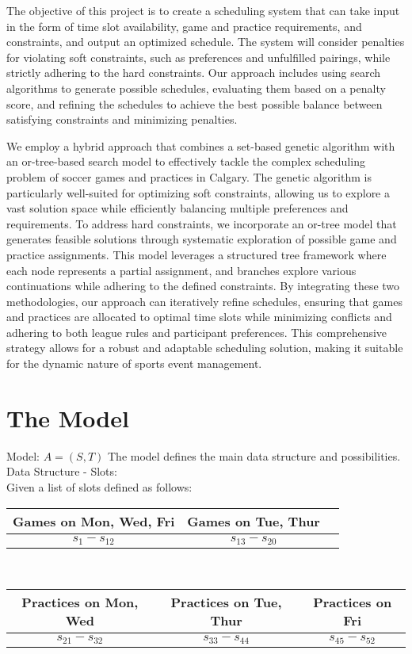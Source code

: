 \documentclass[12 pt]{article}        	%
\begin{document}
The objective of this project is to create a scheduling system that can take input in the form of time slot availability, game and practice requirements, and constraints, and output an optimized schedule. The system will consider penalties for violating soft constraints, such as preferences and unfulfilled pairings, while strictly adhering to the hard constraints. Our approach includes using search algorithms to generate possible schedules, evaluating them based on a penalty score, and refining the schedules to achieve the best possible balance between satisfying constraints and minimizing penalties.

We employ a hybrid approach that combines a set-based genetic algorithm with an or-tree-based search model to effectively tackle the complex scheduling problem of soccer games and practices in Calgary. The genetic algorithm is particularly well-suited for optimizing soft constraints, allowing us to explore a vast solution space while efficiently balancing multiple preferences and requirements. To address hard constraints, we incorporate an or-tree model that generates feasible solutions through systematic exploration of possible game and practice assignments. This model leverages a structured tree framework where each node represents a partial assignment, and branches explore various continuations while adhering to the defined constraints. By integrating these two methodologies, our approach can iteratively refine schedules, ensuring that games and practices are allocated to optimal time slots while minimizing conflicts and adhering to both league rules and participant preferences. This comprehensive strategy allows for a robust and adaptable scheduling solution, making it suitable for the dynamic nature of sports event management.

\section{The Model}
Model: $A = (S, T)$
The model defines the main data structure and possibilities.
Data Structure - Slots: 
\\
Given a list of slots defined as follows:
\\\begin{tabular}{|c|c|c|}
    \hline
     Games on Mon, Wed, Fri & Games on Tue, Thur   \\ \hline
     $s_1 - s_{12}$ & $s_{13} - s_{20}$  \\
     \hline
\end{tabular}
\\\begin{tabular}{|c|c|c|}
    \hline
     Practices on Mon, Wed & Practices on Tue, Thur & Practices on Fri  \\ \hline
     $s_{21} - s_{32}$ & $s_{33} - s_{44}$ & $s_{45} - s_{52}$ 
    \\ \hline
\end{tabular}
\end{document}
